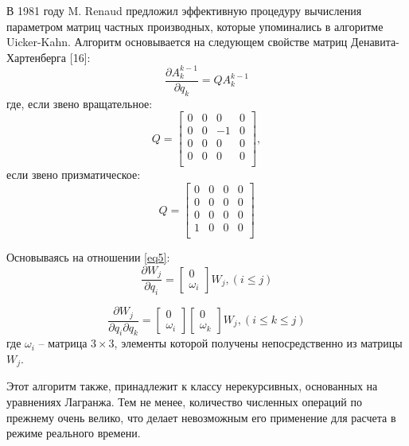 В 1981 году M. Renaud предложил эффективную процедуру вычисления параметром матриц частных производных, которые упоминались в алгоритме Uicker-Kahn. Алгоритм основывается на следующем свойстве матриц Денавита-Хартенберга [16]:
\begin{equation}\label{eq5}
\frac{\partial A_k^{k-1}}{\partial q_k} = Q A_k^{k-1}
\end{equation}
где, если звено вращательное:
\begin{equation}
Q = 
\begin{bmatrix}
0&0&0&0\\
0&0&-1&0\\
0&0&0&0\\
0&0&0&0\\
\end{bmatrix},
\end{equation} 
если звено призматическое:
\begin{equation}
Q = 
\begin{bmatrix}
0&0&0&0\\
0&0&0&0\\
0&0&0&0\\
1&0&0&0\\
\end{bmatrix}
\end{equation} 

Основываясь на отношении \ref{eq5}:
\begin{equation}
\frac{\partial W_j}{\partial q_i} = 
\begin{bmatrix}
0\\
\hline
\omega_i
\end{bmatrix}
W_j, (i \le j)
\end{equation}

\begin{equation}
\frac{\partial W_j}{\partial q_i \partial q_k} = 
\begin{bmatrix}
0\\
\hline
\omega_i
\end{bmatrix}
\begin{bmatrix}
0\\
\hline
\omega_k
\end{bmatrix}
W_j, (i \le k \le j)
\end{equation}
где $\omega_i$ -- матрица $3 \times 3$, элементы которой получены непосредственно из матрицы $W_j$.

Этот алгоритм также, принадлежит к классу нерекурсивных, основанных на уравнениях Лагранжа. Тем не менее, количество численных операций по прежнему очень велико, что делает невозможным его применение для расчета в режиме реального времени.

